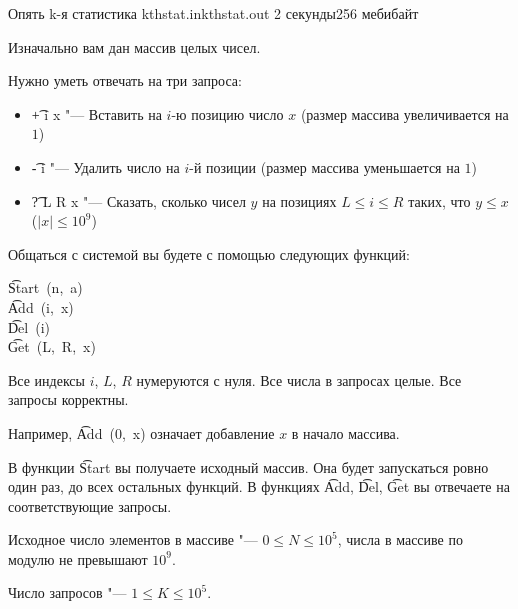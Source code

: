 %
%
%

\begin{problem}{Опять k-я статистика}
{kthstat.in}{kthstat.out}
{2 секунды}{256 мебибайт}{}

Изначально вам дан массив целых чисел.

Нужно уметь отвечать на три запроса:

\begin{itemize}
  \item{\t{+ i x} "--- Вставить на $i$-ю позицию число $x$
        (размер массива увеличивается на $1$)}
  \item{\t{- i} "--- Удалить число на $i$-й позиции
        (размер массива уменьшается на $1$)}
  \item{\t{? L R x} "--- Сказать, сколько чисел $y$
        на позициях $L \le i \le R$ таких, что $y \le x$ ($|x| \le 10^9$)}
\end{itemize}

Общаться с системой вы будете с помощью следующих функций:
\begin{center}
  \t{Start~(n,~a)} \\
  \t{Add~(i,~x)} \\
  \t{Del~(i)} \\
  \t{Get~(L,~R,~x)}
\end{center}

Все индексы $i$, $L$, $R$ нумеруются с нуля.
Все числа в запросах целые.
Все запросы корректны.

Например, \t{Add~(0,~x)} означает добавление $x$ в начало массива.

В функции \t{Start} вы получаете исходный массив.
Она будет запускаться ровно один раз, до всех остальных функций.
В функциях \t{Add}, \t{Del}, \t{Get} вы отвечаете на соответствующие запросы.

Исходное число элементов в массиве "--- $0 \le N \le 10^5$,
числа в массиве по модулю не превышают $10^9$.

Число запросов "--- $1 \le K \le 10^5$.

\Example

\begin{example}
%
\end{example}

\end{problem}
